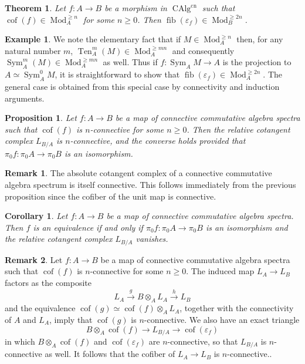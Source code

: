 \documentclass{article}
\newtheorem{theorem}{Theorem}[subsection]
\newtheorem{corollary}{Corollary}[subsection]
\newtheorem{proposition}{Proposition}[subsection]
\theoremstyle{definition}
\newtheorem{example}{Example}[subsection]
\newtheorem{remark}{Remark}[subsection]
\newcommand{\too}{\longrightarrow}
\DeclareMathOperator{\Mod}{Mod}
\DeclareMathOperator{\CAlg}{CAlg}
\DeclareMathOperator{\cof}{cof}
\DeclareMathOperator{\Sym}{Sym}
\DeclareMathOperator{\fib}{fib}
\DeclareMathOperator{\Ten}{Ten}
\newcommand{\cn}{\mathrm{cn}}
\renewcommand{\epsilon}{\varepsilon}
\begin{document}
\begin{theorem}{\em \cite[Theorem 7.4.3.1]{HA}}\label{thm:2ncon}
Let $f:A\to B$ be a morphism in $\CAlg^{\cn}$ such that $\cof(f)\in\Mod_A^{\geq n}$ for some $n\geq 0$.
Then $\fib(\epsilon_f)\in\Mod_B^{\geq 2n}$.
\end{theorem}

\begin{example}
We note the elementary fact that if $M\in\Mod_A^{\geq n}$ then, for any natural number $m$, $\Ten_A^m(M)\in\Mod_A^{\geq mn}$ and consequently $\Sym_A^m(M)\in\Mod_A^{\geq mn}$ as well.
Thus if $f:\Sym_A M\to A$ is the projection to $A\simeq\Sym^0_A M$, it is straightforward to show that $\fib(\epsilon_f)\in\Mod_A^{\geq 2n}$.
The general case is obtained from this special case by connectivity and induction arguments.
\end{example}

\begin{proposition}{\em \cite[Corollary 7.4.3.2]{HA}}
Let $f:A\to B$ be a map of connective commutative algebra spectra such that $\cof(f)$ is
$n$-connective for some $n\geq 0$. Then the relative cotangent complex $L_{B/A}$ is $n$-connective, and the converse holds provided that $\pi_0 f:\pi_0 A\to\pi_0 B$ is an isomorphism.
\end{proposition}

\begin{remark}
The absolute cotangent complex of a connective commutative algebra spectrum is
itself connective.
This follows immediately from the previous proposition since the cofiber of the unit map is connective.
\end{remark}
\begin{corollary}
 Let $f : A\to B$ be a map of connective commutative algebra spectra. Then $f$ is an equivalence if
and only if $\pi_0 f:\pi_0 A\to\pi_0 B$ is an isomorphism and the relative cotangent complex $L_{B/A}$ vanishes.
\end{corollary}
\begin{remark}
Let $f : A\to B$ be a map of connective commutative algebra spectra such that $\cof(f)$ is $n$-connective for some $n \geq 0$.
The induced map $L_A\to L_B$ factors as the composite
\[
L_A\overset{g}{\too} B\otimes_A L_A\overset{h}{\too} L_B
\]
and the equivalence $\cof(g)\simeq\cof(f)\otimes_A L_A$, together with the connectivity of $A$ and $L_A$, imply that $\cof(g)$ is $n$-connective.
We also have an exact triangle
\[
B\otimes_A\cof(f)\too L_{B/A}\too\cof(\epsilon_f)
\]
in which $B\otimes_A\cof(f)$ and $\cof(\epsilon_f)$ are $n$-connective, so that $L_{B/A}$ is $n$-connective as well.
It follows that the cofiber of $L_A\to L_B$ is $n$-connective..
\end{remark}
\end{document}
